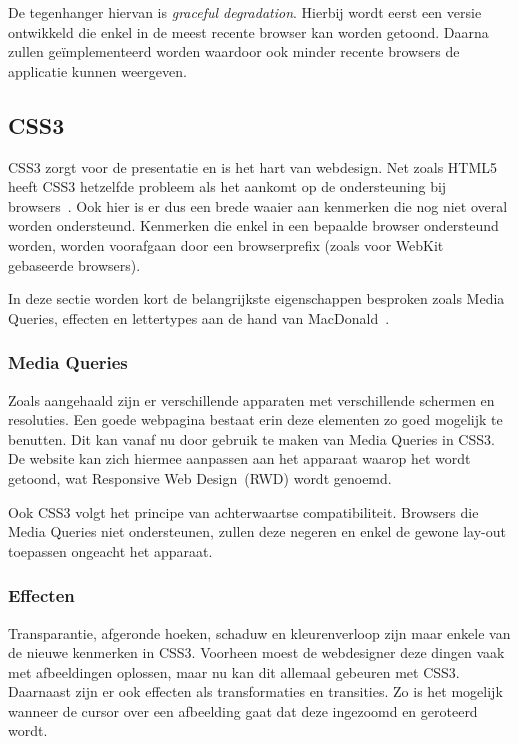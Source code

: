 De tegenhanger hiervan is \emph{graceful degradation}. 
Hierbij wordt eerst een versie ontwikkeld die enkel in de meest recente browser kan worden getoond. 
Daarna zullen  geïmplementeerd worden waardoor ook minder recente browsers de applicatie kunnen weergeven.

\subsection{CSS3}
\label{ref:css3}
CSS3 zorgt voor de presentatie en is het hart van webdesign. 
Net zoals HTML5 heeft CSS3 hetzelfde probleem als het aankomt op de ondersteuning bij browsers~\cite{MacDonald2011}. 
Ook hier is er dus een brede waaier aan kenmerken die nog niet overal worden ondersteund. 
Kenmerken die enkel in een bepaalde browser ondersteund worden, worden voorafgaan door een browserprefix (zoals  voor WebKit gebaseerde browsers).

In deze sectie worden kort de belangrijkste eigenschappen besproken zoals Media Queries, effecten en lettertypes aan de hand van MacDonald~\cite{MacDonald2011}.

\subsubsection{Media Queries}
Zoals aangehaald zijn er verschillende apparaten met verschillende schermen en resoluties. 
Een goede webpagina bestaat erin deze elementen zo goed mogelijk te benutten. 
Dit kan vanaf nu door gebruik te maken van Media Queries in CSS3. 
De website kan zich hiermee aanpassen aan het apparaat waarop het wordt getoond, wat  Responsive Web Design~(RWD) wordt genoemd.

Ook CSS3 volgt het principe van achterwaartse compatibiliteit. 
Browsers die Media Queries niet ondersteunen, zullen deze negeren en enkel de gewone lay-out toepassen ongeacht het apparaat.

\subsubsection{Effecten}
Transparantie, afgeronde hoeken, schaduw en kleurenverloop zijn maar enkele van de nieuwe kenmerken in CSS3. 
Voorheen moest de webdesigner deze dingen vaak met afbeeldingen oplossen, maar nu kan dit allemaal gebeuren met CSS3. 
Daarnaast zijn er ook effecten als transformaties en transities. 
Zo is het mogelijk wanneer de cursor over een afbeelding gaat dat deze ingezoomd en geroteerd wordt. 

